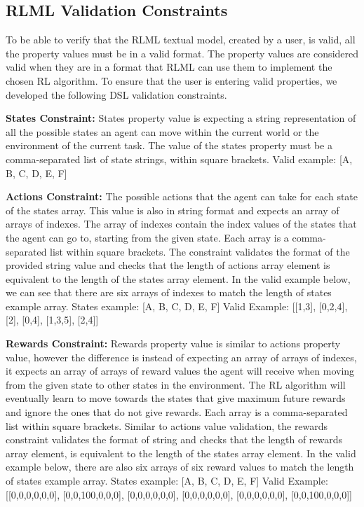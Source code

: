 \documentclass[11pt,letterpaper]{ryersonSGSThesis}
\begin{document}
\begin{ryersonSGSThesis}
    \section {RLML Validation Constraints}
        To be able to verify that the RLML textual model, created by a user, is valid, all the property values must be in a valid format. The property values are considered valid when they are in a format that RLML can use them to implement the chosen RL algorithm. To ensure that the user is entering valid properties, we developed the following DSL validation constraints.
    
        \textbf{States Constraint:} States property value is expecting a string representation of all the possible states an agent can move within the current world or the environment of the current task. The value of the states property must be a comma-separated list of state strings, within square brackets.\newline
        Valid example: [A, B, C, D, E, F]
        
        \textbf{Actions Constraint:} The possible actions that the agent can take for each state of the states array. This value is also in string format and expects an array of arrays of indexes. The array of indexes contain the index values of the states that the agent can go to, starting from the given state. Each array is a comma-separated list within square brackets. The constraint validates the format of the provided string value and checks that the length of actions array element is equivalent to the length of the states array element. In the valid example below, we can see that there are six arrays of indexes to match the length of states example array.\newline
        States example: [A, B, C, D, E, F]\newline
        Valid Example: [[1,3], [0,2,4], [2], [0,4], [1,3,5], [2,4]]
        
        \textbf{Rewards Constraint:} Rewards property value is similar to actions property value, however the difference is instead of expecting an array of arrays of indexes, it expects an array of arrays of reward values the agent will receive when moving from the given state to other states in the environment. The RL algorithm will eventually learn to move towards the states that give maximum future rewards and ignore the ones that do not give rewards. Each array is a comma-separated list within square brackets. Similar to actions value validation, the rewards constraint validates the format of string and checks that the length of rewards array element, is equivalent to the length of the states array element. In the valid example below, there are also six arrays of six reward values to match the length of states example array.\newline
        States example: [A, B, C, D, E, F] \newline
        Valid Example: [[0,0,0,0,0,0], [0,0,100,0,0,0], [0,0,0,0,0,0], [0,0,0,0,0,0], [0,0,0,0,0,0], [0,0,100,0,0,0]]
        

\end{ryersonSGSThesis}
\end{document}
